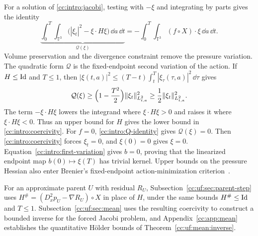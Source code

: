 For a solution of \eqref{cc:intro:jacobi}, testing with $-\xi$ and
integrating by parts gives the identity
\begin{equation}\label{cc:intro:Q-identity}
 \underbrace{\int_0^T\!\int_{\mathbb T^3}
   \bigl(|\xi_t|^2-\xi\cdot H\xi\bigr)\,\dd a\,\dd t}_{\mathcal Q(\xi)}
 =-\int_0^T\!\int_{\mathbb T^3}(f\circ X)\cdot\xi\,\dd a\,\dd t.
\end{equation}
Volume preservation and the divergence constraint remove the pressure
variation. The quadratic form $\mathcal Q$ is the fixed-endpoint second variation of the action.
If $H\le\operatorname{Id}$ and $T\le1$, then
${|\xi(t,a)|^2\le(T-t)\int_t^T|\xi_\tau(\tau,a)|^2\,\dd\tau}$ gives
\begin{equation}\label{cc:intro:coercivity}
 \mathcal Q(\xi)\ge\Bigl(1-\frac{T^2}{2}\Bigr)\|\xi_t\|_{L^2_{t,a}}^2
 \ge\frac12\|\xi_t\|_{L^2_{t,a}}^2 .
\end{equation}
The term $-\xi\cdot H\xi$ lowers the integrand where $\xi\cdot H\xi>0$
and raises it where $\xi\cdot H\xi<0$. Thus an upper bound for $H$ gives
the lower bound in \eqref{cc:intro:coercivity}.
For $f=0$, \eqref{cc:intro:Q-identity} gives $\mathcal Q(\xi)=0$. Then
\eqref{cc:intro:coercivity} forces $\xi_t=0$, and $\xi(0)=0$ gives $\xi=0$.
Equation~\eqref{cc:intro:first-variation} gives $b=0$, proving that the linearized
endpoint map $b(0)\mapsto\xi(T)$ has trivial kernel.
Upper bounds on the pressure Hessian also enter Brenier's fixed-endpoint
action-minimization criterion~\cite{Brenier1989,Brenier1999}.

For an approximate parent $U$ with residual $R_U$,
Subsection~\ref{cc:uf:sec:parent-step} uses
$H^\#=(D_x^2p_U-\nabla R_U)\circ X$ in place of $H$, under the same
bounds $H^\#\le\operatorname{Id}$ and $T\le1$. Subsection~\ref{cc:uf:sec:mean} uses
the resulting coercivity to construct a bounded inverse for the forced
Jacobi problem, and
Appendix~\ref{cc:app:mean} establishes the quantitative H\"older bounds
of Theorem~\ref{cc:uf:mean:inverse}.

